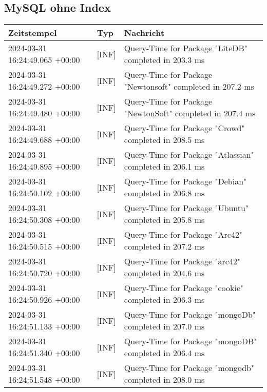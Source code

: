 \documentclass[10pt,a4paper,twoside]{article}
\begin{document}
\begin{appendices}
            \subsection{MySQL ohne Index} \label{subsec:MySQLOhneIndex}
                {
                {\small
                \begin{tabularx}{\textwidth}{|l|l|X|}
                    \hline
                    \textbf{Zeitstempel} & \textbf{Typ} & \textbf{Nachricht} \\
                    \hline
                    \endhead
                    2024-03-31 16:24:49.065 +00:00 & [INF] & Query-Time for Package "LiteDB" completed in 203.3 ms \\
                    2024-03-31 16:24:49.272 +00:00 & [INF] & Query-Time for Package "Newtonsoft" completed in 207.2 ms \\
                    2024-03-31 16:24:49.480 +00:00 & [INF] & Query-Time for Package "NewtonSoft" completed in 207.4 ms \\
                    2024-03-31 16:24:49.688 +00:00 & [INF] & Query-Time for Package "Crowd" completed in 208.5 ms \\
                    2024-03-31 16:24:49.895 +00:00 & [INF] & Query-Time for Package "Atlassian" completed in 206.1 ms \\
                    2024-03-31 16:24:50.102 +00:00 & [INF] & Query-Time for Package "Debian" completed in 206.8 ms \\
                    2024-03-31 16:24:50.308 +00:00 & [INF] & Query-Time for Package "Ubuntu" completed in 205.8 ms \\
                    2024-03-31 16:24:50.515 +00:00 & [INF] & Query-Time for Package "Arc42" completed in 207.2 ms \\
                    2024-03-31 16:24:50.720 +00:00 & [INF] & Query-Time for Package "arc42" completed in 204.6 ms \\
                    2024-03-31 16:24:50.926 +00:00 & [INF] & Query-Time for Package "cookie" completed in 206.3 ms \\
                    2024-03-31 16:24:51.133 +00:00 & [INF] & Query-Time for Package "mongoDb" completed in 207.0 ms \\
                    2024-03-31 16:24:51.340 +00:00 & [INF] & Query-Time for Package "mongoDB" completed in 206.4 ms \\
                    2024-03-31 16:24:51.548 +00:00 & [INF] & Query-Time for Package "mongodb" completed in 208.0 ms \\

\end{tabularx}}}
\end{appendices}
\end{document}
